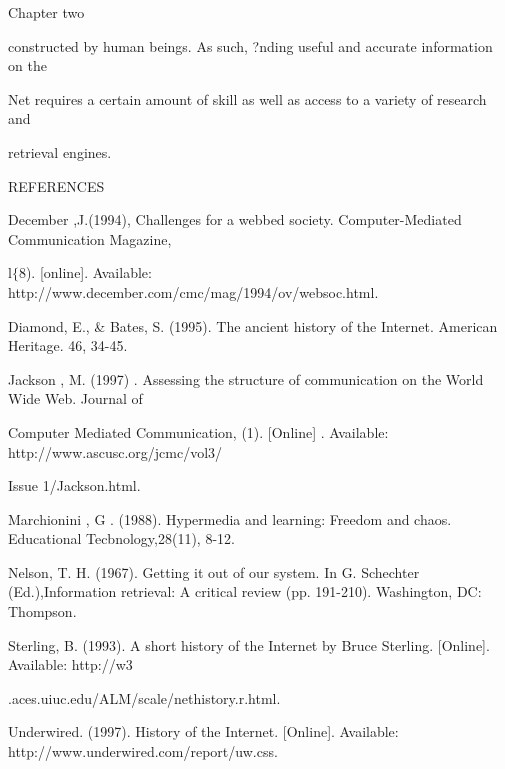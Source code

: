 \documentclass{book}
\begin{document}
\noindent \begin{flushleft}
Chapter two

\noindent 

\noindent constructed by human beings. As such, ?nding useful and accurate information on the

\noindent Net requires a certain amount of skill as well as access to a variety of research and

\noindent retrieval engines.

\noindent 

\noindent REFERENCES

\noindent 

\noindent December ,J.(1994), Challenges for a webbed society. Computer-Mediated Communication Magazine,

\noindent l$\mathrm{\{}$8). [online]. Available: http://www.december.com/cmc/mag/1994/ov/websoc.html.

\noindent Diamond, E., \& Bates, S. (1995). The ancient history of the Internet. American Heritage. 46, 34-45.

\noindent Jackson , M. (1997) . Assessing the  structure of communication on the World Wide Web. Journal of

\noindent Computer Mediated Communication, (1). [Online] . Available: http://www.ascusc.org/jcmc/vol3/

\noindent Issue 1/Jackson.html.

\noindent Marchionini , G . (1988). Hypermedia and learning: Freedom and chaos. Educational Tecbnology,28(11),  8-12.

\noindent Nelson, T. H. (1967). Getting it out of our system. In G. Schechter (Ed.),Information retrieval: A critical review (pp. 191-210). Washington, DC:  Thompson.

\noindent Sterling, B. (1993). A short history of the Internet by  Bruce  Sterling. [Online]. Available: http://w3

\noindent .aces.uiuc.edu/ALM/scale/nethistory.r.html.

\noindent Underwired. (1997). History of the Internet. [Online]. Available: http://www.underwired.com/report/uw.css.

\noindent 
\end{flushleft}
\end{document}
